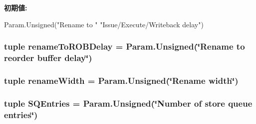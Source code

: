\label{classSimpleOzoneCPU_1_1SimpleOzoneCPU_acdec10386abd09a4724775d533fc65d4}
{\bfseries 初期値:}
\begin{DoxyCode}
Param.Unsigned("Rename to "
               "Issue/Execute/Writeback delay")
\end{DoxyCode}
\hypertarget{classSimpleOzoneCPU_1_1SimpleOzoneCPU_a1c17c9a7d634b03c7c2b7c0ba0ca21b9}{
\subsubsection[{renameToROBDelay}]{\setlength{\rightskip}{0pt plus 5cm}tuple {\bf renameToROBDelay} = Param.Unsigned(\char`\"{}Rename to reorder buffer delay\char`\"{})}}
\label{classSimpleOzoneCPU_1_1SimpleOzoneCPU_a1c17c9a7d634b03c7c2b7c0ba0ca21b9}
\hypertarget{classSimpleOzoneCPU_1_1SimpleOzoneCPU_a6500ae95e23f48433d63280c42925a31}{
\subsubsection[{renameWidth}]{\setlength{\rightskip}{0pt plus 5cm}tuple {\bf renameWidth} = Param.Unsigned(\char`\"{}Rename {\bf width}\char`\"{})}}
\label{classSimpleOzoneCPU_1_1SimpleOzoneCPU_a6500ae95e23f48433d63280c42925a31}
\hypertarget{classSimpleOzoneCPU_1_1SimpleOzoneCPU_a910857438278a89a287832cf7087317b}{
\subsubsection[{SQEntries}]{\setlength{\rightskip}{0pt plus 5cm}tuple {\bf SQEntries} = Param.Unsigned(\char`\"{}Number of store queue entries\char`\"{})}}
\label{classSimpleOzoneCPU_1_1SimpleOzoneCPU_a910857438278a89a287832cf7087317b}
